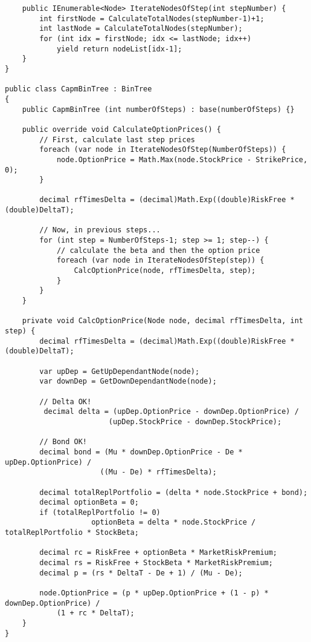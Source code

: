 \begin{lstlisting}
	public IEnumerable<Node> IterateNodesOfStep(int stepNumber) {
		int firstNode = CalculateTotalNodes(stepNumber-1)+1;
		int lastNode = CalculateTotalNodes(stepNumber);
		for (int idx = firstNode; idx <= lastNode; idx++)
			yield return nodeList[idx-1];
	}
}

public class CapmBinTree : BinTree
{
	public CapmBinTree (int numberOfSteps) : base(numberOfSteps) {}
	
	public override void CalculateOptionPrices() {
		// First, calculate last step prices
		foreach (var node in IterateNodesOfStep(NumberOfSteps)) {
			node.OptionPrice = Math.Max(node.StockPrice - StrikePrice, 0);
		}

		decimal rfTimesDelta = (decimal)Math.Exp((double)RiskFree * (double)DeltaT);
		
		// Now, in previous steps... 
		for (int step = NumberOfSteps-1; step >= 1; step--) {
			// calculate the beta and then the option price
			foreach (var node in IterateNodesOfStep(step)) {
				CalcOptionPrice(node, rfTimesDelta, step);
			}
		}
	}

	private void CalcOptionPrice(Node node, decimal rfTimesDelta, int step) {
		decimal rfTimesDelta = (decimal)Math.Exp((double)RiskFree * (double)DeltaT);

		var upDep = GetUpDependantNode(node);
		var downDep = GetDownDependantNode(node);
		
		// Delta OK!
		 decimal delta = (upDep.OptionPrice - downDep.OptionPrice) /
            			(upDep.StockPrice - downDep.StockPrice);
		
		// Bond OK!
		decimal bond = (Mu * downDep.OptionPrice - De * upDep.OptionPrice) /
      			      ((Mu - De) * rfTimesDelta);
		
		decimal totalReplPortfolio = (delta * node.StockPrice + bond);
		decimal optionBeta = 0;
		if (totalReplPortfolio != 0)
	                optionBeta = delta * node.StockPrice / totalReplPortfolio * StockBeta;

		decimal rc = RiskFree + optionBeta * MarketRiskPremium;
		decimal rs = RiskFree + StockBeta * MarketRiskPremium;
		decimal p = (rs * DeltaT - De + 1) / (Mu - De);

		node.OptionPrice = (p * upDep.OptionPrice + (1 - p) * downDep.OptionPrice) / 
			(1 + rc * DeltaT);
	}
}
\end{lstlisting}
